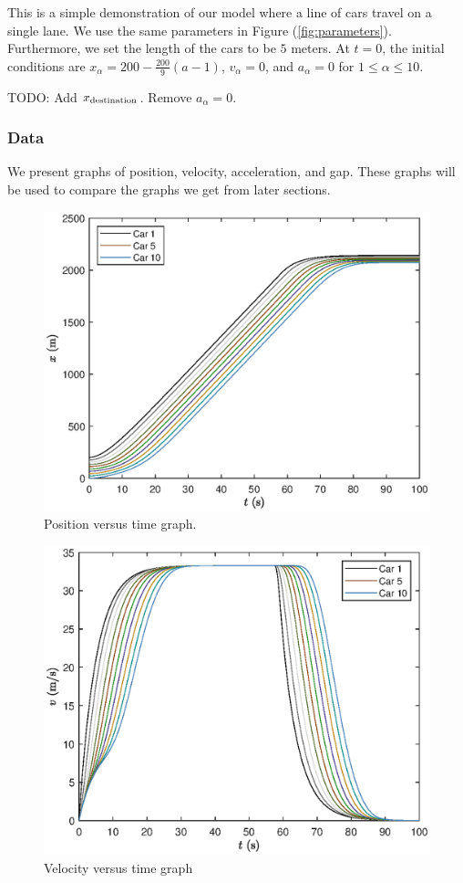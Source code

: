 \documentclass[12pt]{article}
\begin{document}
    This is a simple demonstration of our model where a line of cars travel on a single lane. We use the same parameters in Figure (\ref{fig:parameters}). Furthermore, we set the length of the cars to be $5$ meters. At $t=0$, the initial conditions are $x_\alpha = 
    200-\frac{200}{9}\left(a-1\right)$, $v_\alpha = 0$, and $a_\alpha = 0$ for $1 \leq \alpha \leq 10$. 

    TODO: Add $x_{\rm destination}$. Remove $a_{\alpha} = 0$.
    \subsubsection{Data}
    We present graphs of position, velocity, acceleration, and gap. These graphs will be used to compare the graphs we get from later sections. 
    
      \begin{figure}[H]
          \includegraphics[width=13cm]{HomogeneousTraffic1.eps}
          \centering
          \caption{Position versus time graph.}
      \end{figure}

      \begin{figure}[H]
        \includegraphics[width=13cm]{HomogeneousTraffic2.eps}
        \centering
        \caption{Velocity versus time graph}
      \end{figure}
\end{document}

